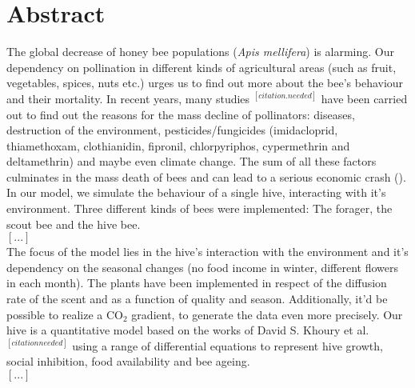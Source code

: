 \section{Abstract}
The global decrease of honey bee populations (\textit{Apis mellifera}) is alarming. Our dependency on pollination in different kinds of agricultural areas (such as fruit, vegetables, spices, nuts etc.) urges us to find out more about the bee's behaviour and their mortality. In recent years, many studies $^{[citation.needed]}$ have been carried out to find out the reasons for the mass decline of pollinators: diseases, destruction of the environment, pesticides/fungicides (imidacloprid, thiamethoxam, clothianidin, fipronil, chlorpyriphos, cypermethrin and deltamethrin) and maybe even climate change. The sum of all these factors culminates in the mass death of bees and can lead to a serious economic crash ().\\
In our model, we simulate the behaviour of a single hive, interacting with it's environment. Three different kinds of bees were implemented: The forager, the scout bee and the hive bee. \\
$[...]$\\
The focus of the model lies in the hive's interaction with the environment and it's dependency on the seasonal changes (no food income in winter, different flowers in each month). The plants have been implemented in respect of the diffusion rate of the scent and as a function of quality and season. Additionally, it'd be possible to realize a CO$_{2}$ gradient, to generate the data even more precisely. Our hive is a quantitative model based on the works of David S. Khoury et al. $^[citation needed]$ using a range of differential equations to represent hive growth, social inhibition, food availability and bee ageing.  
\\
$[...]$\\


